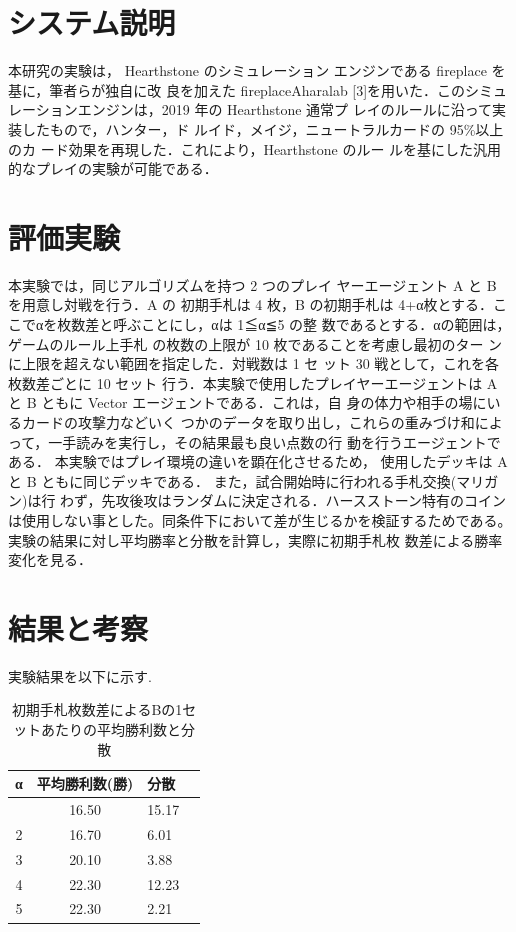 \documentclass[twocolumn]{ltjsarticle}
\begin{document}
\section{システム説明}
\small{
  本研究の実験は， Hearthstone のシミュレーション
エンジンである fireplace を基に，筆者らが独自に改
良を加えた fireplaceAharalab [3]を用いた．このシミュ
レーションエンジンは，2019 年の Hearthstone 通常プ
レイのルールに沿って実装したもので，ハンター，ド
ルイド，メイジ，ニュートラルカードの 95\%以上のカ
ード効果を再現した．これにより，Hearthstone のルー
ルを基にした汎用的なプレイの実験が可能である．
}
\section{評価実験}
\small{
  本実験では，同じアルゴリズムを持つ 2 つのプレイ
ヤーエージェント A と B を用意し対戦を行う．A の
初期手札は 4 枚，B の初期手札は 4+α枚とする．こ
こでαを枚数差と呼ぶことにし，αは 1≦α≦5 の整
数であるとする．αの範囲は，ゲームのルール上手札
の枚数の上限が 10 枚であることを考慮し最初のター
ンに上限を超えない範囲を指定した．対戦数は 1 セ
ット 30 戦として，これを各枚数差ごとに 10 セット
行う．本実験で使用したプレイヤーエージェントは A
と B ともに Vector エージェントである．これは，自
身の体力や相手の場にいるカードの攻撃力などいく
つかのデータを取り出し，これらの重みづけ和によ
って，一手読みを実行し，その結果最も良い点数の行
動を行うエージェントである．
本実験ではプレイ環境の違いを顕在化させるため，
使用したデッキは A と B ともに同じデッキである．
また，試合開始時に行われる手札交換(マリガン)は行
わず，先攻後攻はランダムに決定される．ハースストーン特有のコインは使用しない事とした。同条件下において差が生じるかを検証するためである。
実験の結果に対し平均勝率と分散を計算し，実際に初期手札枚
数差による勝率変化を見る．
}
\section{結果と考察}
\small{
  実験結果を以下に示す.
}
\begin{table}[h]
  \centering
  \caption{初期手札枚数差によるBの1セットあたりの平均勝利数と分散}
  \begin{tabular}{clll}
    α &平均勝利数(勝)& 分散\\
    \hline \hline
    \centering
    1&\multicolumn{1}{c}{16.50}&\multicolumn{1}{l}{15.17}\\
    2&\multicolumn{1}{c}{16.70}&\multicolumn{1}{l}{6.01}\\
    3&\multicolumn{1}{c}{20.10}&\multicolumn{1}{l}{3.88}\\
    4&\multicolumn{1}{c}{22.30}&\multicolumn{1}{l}{12.23}\\
    5&\multicolumn{1}{c}{22.30}&\multicolumn{1}{l}{2.21}\\
    \hline%
  \end{tabular}
\end{table}
\end{document}
